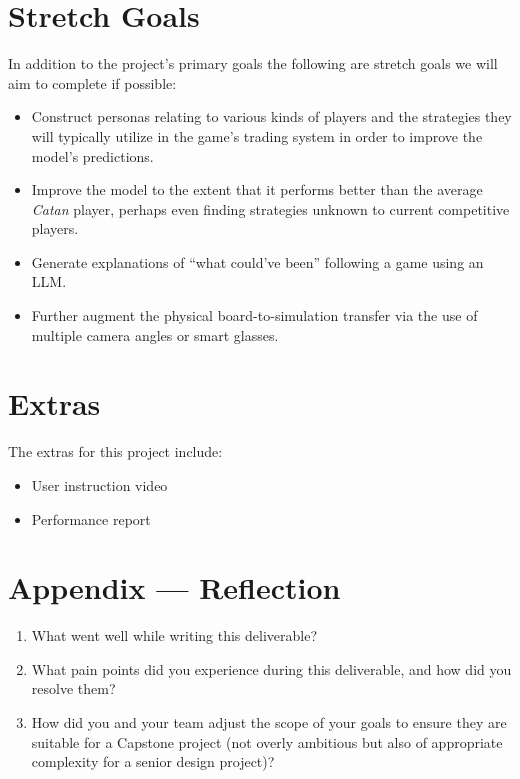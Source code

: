 \documentclass{article}
\begin{document}
\section{Stretch Goals}\label{sec:stretch-goals}
In addition to the project’s primary goals the following are stretch goals we will aim to complete if possible:
\begin{itemize}
    \item Construct personas relating to various kinds of players and the strategies they will typically utilize in the game’s trading system in order to improve the model’s predictions.
    \item Improve the model to the extent that it performs better than the average \emph{Catan} player, perhaps even finding strategies unknown to current competitive players.
    \item Generate explanations of “what could’ve been” following a game using an LLM\@.
    \item Further augment the physical board-to-simulation transfer via the use of multiple camera angles or smart glasses.
\end{itemize}


\section{Extras}\label{sec:extras}


\raggedright

The extras for this project include:
\begin{itemize}
    \item User instruction video
    \item Performance report
\end{itemize}

\newpage{}

\section*{Appendix --- Reflection}

\begin{enumerate}
    \item What went well while writing this deliverable?
    \item What pain points did you experience during this deliverable, and how
    did you resolve them?
    \item How did you and your team adjust the scope of your goals to ensure
    they are suitable for a Capstone project (not overly ambitious but also of
    appropriate complexity for a senior design project)?
\end{enumerate}
\end{document}
